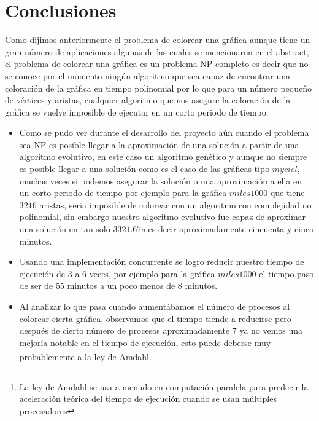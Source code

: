 \documentclass{article}
\begin{document}
\newpage 
\section{Conclusiones}
Como dijimos anteriormente el problema de colorear una gráfica aunque tiene un gran número de aplicaciones algunas de las cuales se mencionaron en el abstract, el problema de colorear una gráfica es un problema NP-completo es decir que no se conoce por el momento ningún algoritmo que sea capaz de encontrar una coloración de la gráfica en tiempo polinomial por lo que para un número pequeño de vértices y aristas, cualquier algoritmo que nos asegure la coloración de la gráfica se vuelve imposible de ejecutar en un corto periodo de tiempo.\\
\begin{itemize}
    \item Como se pudo ver durante el desarrollo del proyecto aún cuando el problema sea NP es posible llegar a la aproximación de una solución a partir de una algoritmo evolutivo, en este caso un algoritmo genético y aunque no siempre es posible llegar a una solución como es el caso de las gráficas tipo $myciel$, muchas veces si podemos asegurar la solución o una aproximación a ella en un corto periodo de tiempo por ejemplo para la gráfica $miles1000$ que tiene $3216$ aristas, seria imposible de colorear con un algoritmo con complejidad no polinomial, sin embargo nuestro algoritmo evolutivo fue capaz de aproximar una solución en tan solo $3321.67s$ es decir aproximadamente cincuenta y cinco minutos.
    \item Usando una implementación concurrente se logro reducir nuestro tiempo de ejecución de 3 a 6 veces, por ejemplo para la gráfica $miles1000$ el tiempo paso de ser de 55 minutos a un poco menos de 8 minutos.
    \item Al analizar lo que pasa cuando aumentábamos el número de procesos al colorear cierta gráfica, observamos que el tiempo tiende a reducirse pero después de cierto número de procesos aproximadamente 7 ya no vemos una mejoría notable en el tiempo de ejecución, esto puede deberse muy probablemente a la ley de Amdahl. \footnote{La ley de Amdahl se usa a menudo en computación paralela para predecir la aceleración teórica del tiempo de ejecución cuando se usan múltiples procesadores}
\end{itemize}

\newpage
\end{document}
